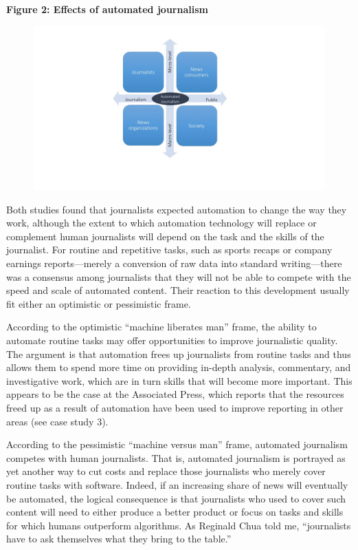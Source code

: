 \documentclass[notoc, symmetric, nobib, nols]{towcenter-guideto-book}
\begin{document}
\textbf{Figure 2: Effects of automated journalism}
\begin{figure}
\begin{centering}
\includegraphics[width=\textwidth]{graphics/aj_image2.jpg}
\end{centering}
\end{figure}

Both studies found that journalists expected automation to change the way they work, although the extent to which automation technology will replace or complement human journalists will depend on the task and the skills of the journalist. For routine and repetitive tasks, such as sports recaps or company earnings reports---merely a conversion of raw data into standard writing---there was a consensus among journalists that they will not be able to compete with the speed and scale of automated content. Their reaction to this development usually fit either an optimistic or pessimistic frame. 

According to the optimistic ``machine liberates man'' frame, the ability to automate routine tasks may offer opportunities to improve journalistic quality. The argument is that automation frees up journalists from routine tasks and thus allows them to spend more time on providing in-depth analysis, commentary, and investigative work, which are in turn skills that will become more important. This appears to be the case at the Associated Press, which reports that the resources freed up as a result of automation have been used to improve reporting in other areas (see case study 3). 

According to the pessimistic ``machine versus man'' frame, automated journalism competes with human journalists. That is, automated journalism is portrayed as yet another way to cut costs and replace those journalists who merely cover routine tasks with software. Indeed, if an increasing share of news will eventually be automated, the logical consequence is that journalists who used to cover such content will need to either produce a better product or focus on tasks and skills for which humans outperform algorithms. As Reginald Chua told me, “journalists have to ask themselves what they bring to the table.”
\end{document}
